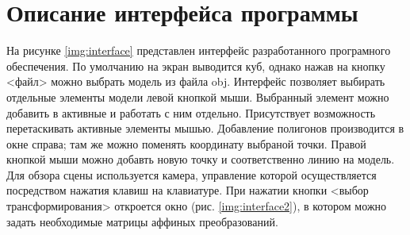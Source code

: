 \section{Описание интерфейса программы}
На рисунке \ref{img:interface} представлен интерфейс разработанного програмного обеспечения. По умолчанию на экран выводится куб, однако нажав на кнопку <файл> можно выбрать модель из файла obj. Интерфейс позволяет выбирать отдельные элементы модели левой кнопкой мыши. Выбранный элемент можно добавить в активные и работать с ним отдельно. Присутствует возможность перетаскивать активные элементы мышью. Добавление полигонов производится в окне справа; там же можно поменять координату выбраной точки. Правой кнопкой мыши можно добавть новую точку и соответственно линию на модель. Для обзора сцены используется камера, управление которой осуществляется посредством нажатия клавиш на клавиатуре. При нажатии кнопки <выбор трансформирования> откроется окно (рис. \ref{img:interface2}), в котором можно задать необходимые матрицы аффиных преобразований.
\begin{center}
	\label{img:interface}
\end{center}
\begin{center}
	\label{img:interface2}
\end{center}